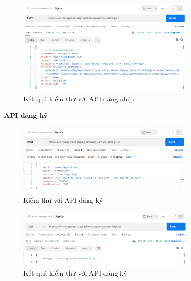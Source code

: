 		\newpage

		\begin{figure}[!ht]
			\includegraphics[width=0.8\textwidth]{Images/testing/API-sign-in-result.png}
			\centering
			\linebreak
			\caption{Kết quả kiểm thử với API đăng nhập}
		\end{figure}
		
		\newpage	
		
		\textbf{API đăng ký}
		
		\begin{figure}[!ht]
			\includegraphics[width=0.8\textwidth]{Images/testing/API-sign-up.png}
			\centering
			\linebreak
			\caption{Kiểm thử với API đăng ký}
		\end{figure}
		
		\begin{figure}[!ht]
			\includegraphics[width=0.8\textwidth]{Images/testing/API-sign-up-result.png}
			\centering
			\linebreak
			\caption{Kết quả kiểm thử với API đăng ký}
		\end{figure}
		
